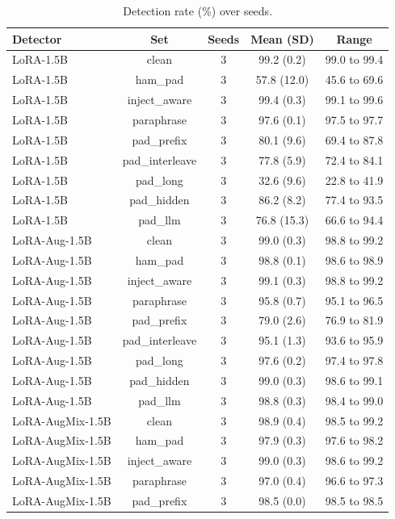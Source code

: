 \begin{table}[t]
\centering
\caption{Detection rate (\%) over seeds.}
\label{tab:seeds5}
\footnotesize
\begin{tabular}{lcccc}
\toprule
\textbf{Detector} & \textbf{Set} & \textbf{Seeds} & \textbf{Mean (SD)} & \textbf{Range} \\
\midrule
LoRA-1.5B & clean & 3 & 99.2 (0.2) & 99.0 to 99.4 \\
LoRA-1.5B & ham\_pad & 3 & 57.8 (12.0) & 45.6 to 69.6 \\
LoRA-1.5B & inject\_aware & 3 & 99.4 (0.3) & 99.1 to 99.6 \\
LoRA-1.5B & paraphrase & 3 & 97.6 (0.1) & 97.5 to 97.7 \\
LoRA-1.5B & pad\_prefix & 3 & 80.1 (9.6) & 69.4 to 87.8 \\
LoRA-1.5B & pad\_interleave & 3 & 77.8 (5.9) & 72.4 to 84.1 \\
LoRA-1.5B & pad\_long & 3 & 32.6 (9.6) & 22.8 to 41.9 \\
LoRA-1.5B & pad\_hidden & 3 & 86.2 (8.2) & 77.4 to 93.5 \\
LoRA-1.5B & pad\_llm & 3 & 76.8 (15.3) & 66.6 to 94.4 \\
LoRA-Aug-1.5B & clean & 3 & 99.0 (0.3) & 98.8 to 99.2 \\
LoRA-Aug-1.5B & ham\_pad & 3 & 98.8 (0.1) & 98.6 to 98.9 \\
LoRA-Aug-1.5B & inject\_aware & 3 & 99.1 (0.3) & 98.8 to 99.2 \\
LoRA-Aug-1.5B & paraphrase & 3 & 95.8 (0.7) & 95.1 to 96.5 \\
LoRA-Aug-1.5B & pad\_prefix & 3 & 79.0 (2.6) & 76.9 to 81.9 \\
LoRA-Aug-1.5B & pad\_interleave & 3 & 95.1 (1.3) & 93.6 to 95.9 \\
LoRA-Aug-1.5B & pad\_long & 3 & 97.6 (0.2) & 97.4 to 97.8 \\
LoRA-Aug-1.5B & pad\_hidden & 3 & 99.0 (0.3) & 98.6 to 99.1 \\
LoRA-Aug-1.5B & pad\_llm & 3 & 98.8 (0.3) & 98.4 to 99.0 \\
LoRA-AugMix-1.5B & clean & 3 & 98.9 (0.4) & 98.5 to 99.2 \\
LoRA-AugMix-1.5B & ham\_pad & 3 & 97.9 (0.3) & 97.6 to 98.2 \\
LoRA-AugMix-1.5B & inject\_aware & 3 & 99.0 (0.3) & 98.6 to 99.2 \\
LoRA-AugMix-1.5B & paraphrase & 3 & 97.0 (0.4) & 96.6 to 97.3 \\
LoRA-AugMix-1.5B & pad\_prefix & 3 & 98.5 (0.0) & 98.5 to 98.5 \\

\end{tabular}
\end{table}
